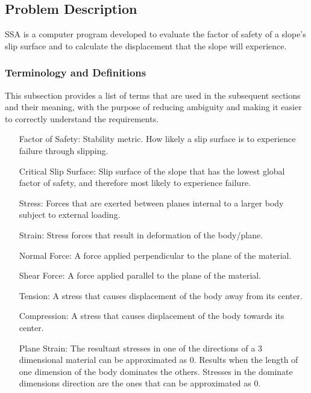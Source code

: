 \documentclass[12pt]{article}
\begin{document}
\subsection{Problem Description}
\label{Sec:ProbDesc}
SSA is a computer program developed to evaluate the factor of safety of a slope's slip surface and to calculate the displacement that the slope will experience.
\subsubsection{Terminology and Definitions}
\label{Sec:TermandDefi}
This subsection provides a list of terms that are used in the subsequent sections and their meaning, with the purpose of reducing ambiguity and making it easier to correctly understand the requirements.
\begin{itemize}
\item[Factor of Safety:]Stability metric. How likely a slip surface is to experience failure through slipping.
\item[Critical Slip Surface:]Slip surface of the slope that has the lowest global factor of safety, and therefore most likely to experience failure.
\item[Stress:]Forces that are exerted between planes internal to a larger body subject to external loading.
\item[Strain:]Stress forces that result in deformation of the body/plane.
\item[Normal Force:]A force applied perpendicular to the plane of the material.
\item[Shear Force:]A force applied parallel to the plane of the material.
\item[Tension:]A stress that causes displacement of the body away from its center.
\item[Compression:]A stress that causes displacement of the body towards its center.
\item[Plane Strain:]The resultant stresses in one of the directions of a 3 dimensional material can be approximated as 0. Results when the length of one dimension of the body dominates the others. Stresses in the dominate dimensions direction are the ones that can be approximated as 0.
\end{itemize}
\end{document}
